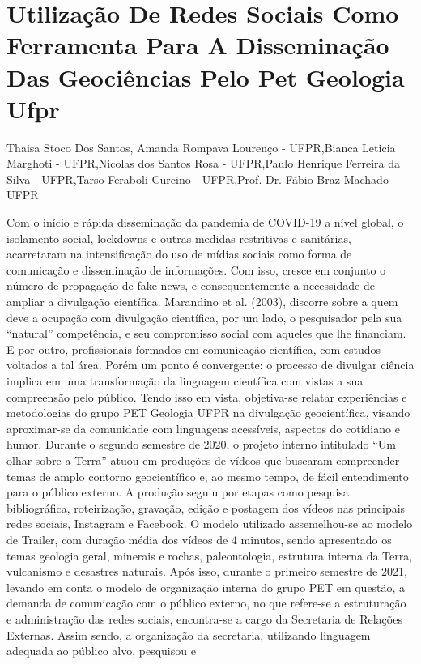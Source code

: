 \section*{Utilização De Redes Sociais Como Ferramenta Para A Disseminação Das Geociências Pelo Pet Geologia Ufpr}

Thaisa Stoco Dos Santos, Amanda Rompava Lourenço - UFPR,Bianca Leticia Marghoti - UFPR,Nicolas dos Santos Rosa - UFPR,Paulo Henrique Ferreira da Silva - UFPR,Tarso Feraboli Curcino - UFPR,Prof. Dr. Fábio Braz Machado - UFPR

Com o início e rápida disseminação da pandemia de COVID-19 a nível global, o isolamento
social, lockdowns e outras medidas restritivas e sanitárias, acarretaram na intensificação do uso
de mídias sociais como forma de comunicação e disseminação de informações. Com isso, cresce
em conjunto o número de propagação de fake news, e consequentemente a necessidade de
ampliar a divulgação científica. Marandino et al. (2003), discorre sobre a quem deve a ocupação
com divulgação científica, por um lado, o pesquisador pela sua “natural” competência, e seu
compromisso social com aqueles que lhe financiam. E por outro, profissionais formados em
comunicação científica, com estudos voltados a tal área. Porém um ponto é convergente: o
processo de divulgar ciência implica em uma transformação da linguagem científica com vistas a
sua compreensão pelo público. Tendo isso em vista, objetiva-se relatar experiências e
metodologias do grupo PET Geologia UFPR na divulgação geocientífica, visando aproximar-se
da comunidade com linguagens acessíveis, aspectos do cotidiano e humor. Durante o segundo
semestre de 2020, o projeto interno intitulado “Um olhar sobre a Terra” atuou em produções de
vídeos que buscaram compreender temas de amplo contorno geocientífico e, ao mesmo tempo,
de fácil entendimento para o público externo. A produção seguiu por etapas como pesquisa
bibliográfica, roteirização, gravação, edição e postagem dos vídeos nas principais redes sociais,
Instagram e Facebook. O modelo utilizado assemelhou-se ao modelo de Trailer, com duração
média dos vídeos de 4 minutos, sendo apresentado os temas geologia geral, minerais e rochas,
paleontologia, estrutura interna da Terra, vulcanismo e desastres naturais. Após isso, durante o
primeiro semestre de 2021, levando em conta o modelo de organização interna do grupo PET em
questão, a demanda de comunicação com o público externo, no que refere-se a estruturação e
administração das redes sociais, encontra-se a cargo da Secretaria de Relações Externas. Assim
sendo, a organização da secretaria, utilizando linguagem adequada ao público alvo, pesquisou e
